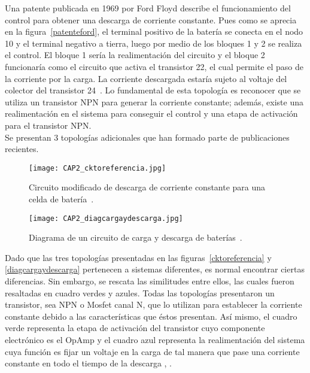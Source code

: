 Una patente publicada en 1969 por Ford Floyd describe el funcionamiento del control para obtener una descarga de corriente constante. Pues como se aprecia en la figura~\ref{patenteford}, el terminal positivo de la batería se conecta en el nodo 10 y el terminal negativo a tierra, luego por medio de los bloques 1 y 2 se realiza el control. El bloque 1 sería la realimentación del circuito y el bloque 2 funcionaría como el circuito que activa el transistor 22, el cual permite el paso de la corriente por la carga. La corriente descargada estaría sujeto al voltaje del colector del transistor 24~\cite{FordFloydE.1966}. Lo fundamental de esta topología es reconocer que se utiliza un transistor NPN para generar la corriente constante; además, existe una realimentación en el sistema para conseguir el control y una etapa de activación para el transistor NPN.\\

Se presentan 3 topologías adicionales que han formado parte de publicaciones recientes. \\

\begin{figure}[!ht]
\begin{center}
\texttt{[image: CAP2\_cktoreferencia.jpg]}
\caption{Circuito modificado de descarga de corriente constante para una celda de batería~\cite{Ping2012}.}
\label{fig:cktoreferencia}
\end{center}
\end{figure}

\begin{figure}[!ht]
\begin{center}
\texttt{[image: CAP2\_diagcargaydescarga.jpg]}
\caption{Diagrama de un circuito de carga y descarga de baterías~\cite{Qiu2007}.}
\label{fig:diagcargaydescarga}
\end{center}
\end{figure}

Dado que las tres topologías presentadas en las figuras~\ref{cktoreferencia} y \ref{diagcargaydescarga}   pertenecen a sistemas diferentes, es normal encontrar ciertas diferencias. Sin embargo, se rescata las similitudes entre ellos, las cuales fueron resaltadas en cuadro verdes y azules. Todas las topologías presentaron un transistor, sea NPN o Mosfet canal N, que lo utilizan para establecer la corriente constante debido a las características que éstos presentan. Así mismo, el cuadro verde representa la etapa de activación del transistor cuyo componente electrónico es el OpAmp y el cuadro azul representa la realimentación del sistema cuya función es fijar un voltaje en la carga de tal manera que pase una corriente constante en todo el tiempo de la descarga \cite{Ping2012}, \cite{Qiu2007} . \\

